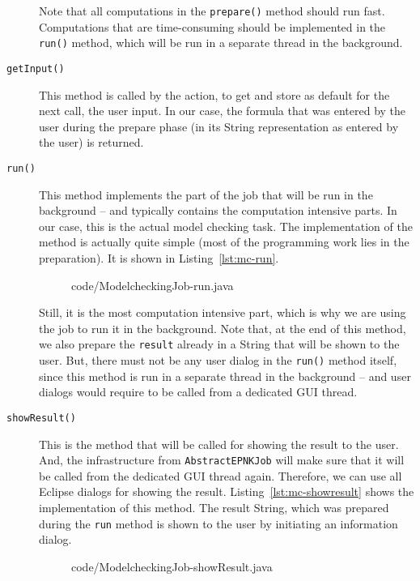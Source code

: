 \begin{description}
    Note that all computations in the {\tt prepare()} method should run fast.
    Computations that are time-consuming should be implemented in the {\tt
    run()} method, which will be run in a separate thread in the background.

\item[{\tt getInput()}] This method is called by the action, to get and store
     as default for the next call, the user input. In our case, the formula
     that was entered by the user during the prepare phase (in its String
     representation as entered by the user) is returned.
     
\item[{\tt run()}] This method implements the part of the job that will be run
     in the background -- and typically contains the computation intensive
     parts. In our case, this is the actual model checking task.
     The implementation of the method is actually quite simple (most of the
     programming work lies in the preparation). It is shown in
     Listing~\ref{lst:mc-run}.
\begin{figure}[tbp!] %
%
{code/ModelcheckingJob-run.java}
\end{figure}
     Still, it is the most computation intensive part, which is why we are using
     the job to run it in the background. Note that, at the end of this method,
     we also prepare the {\tt result} already in a String that will be shown to the
     user. But, there must not be any user dialog in the {\tt run()} method
     itself, since this method is run in a separate thread in the background --
     and user dialogs would require to be called from a dedicated GUI thread. 

\item[{\tt showResult()}] This is the method that will be called for showing
     the result to the user. And, the infrastructure from {\tt AbstractEPNKJob}
     will make sure that it will be called from the dedicated GUI thread again.
     Therefore, we can use all Eclipse dialogs for showing the result. 
     Listing~\ref{lst:mc-showresult} shows the implementation of this method.
     The result String, which was prepared during the {\tt run} method is
     shown to the user by initiating an information dialog.
\begin{figure}[tbp!] %
%
{code/ModelcheckingJob-showResult.java}
\end{figure}


\end{description}
